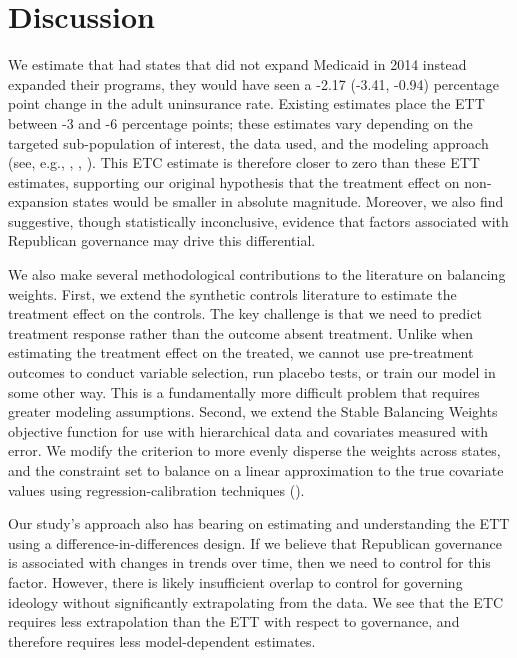 \documentclass[aoas]{imsart}
\theoremstyle{plain}
\theoremstyle{remark}
\begin{document}
\section{Discussion}

We estimate that had states that did not expand Medicaid in 2014 instead expanded their programs, they would have seen a -2.17 (-3.41, -0.94) percentage point change in the adult uninsurance rate. Existing estimates place the ETT between -3 and -6 percentage points; these estimates vary depending on the targeted sub-population of interest, the data used, and the modeling approach (see, e.g., \cite{courtemanche2017early}, \cite{kaestner2017effects}, \cite{frean2017premium}). This ETC estimate is therefore closer to zero than these ETT estimates, supporting our original hypothesis that the treatment effect on non-expansion states would be smaller in absolute magnitude. Moreover, we also find suggestive, though statistically inconclusive, evidence that factors associated with Republican governance may drive this differential. 

We also make several methodological contributions to the literature on balancing weights. First, we extend the synthetic controls literature to estimate the treatment effect on the controls. The key challenge is that we need to predict treatment response rather than the outcome absent treatment. Unlike when estimating the treatment effect on the treated, we cannot use pre-treatment outcomes to conduct variable selection, run placebo tests, or train our model in some other way. This is a fundamentally more difficult problem that requires greater modeling assumptions. Second, we extend the Stable Balancing Weights objective function for use with hierarchical data and covariates measured with error. We modify the criterion to more evenly disperse the weights across states, and the constraint set to balance on a linear approximation to the true covariate values using regression-calibration techniques (\cite{gleser1992importance}).

Our study's approach also has bearing on estimating and understanding the ETT using a difference-in-differences design. If we believe that Republican governance is associated with changes in trends over time, then we need to control for this factor. However, there is likely insufficient overlap to control for governing ideology without significantly extrapolating from the data. We see that the ETC requires less extrapolation than the ETT with respect to governance, and therefore requires less model-dependent estimates.
\end{document}
